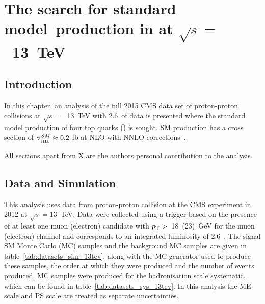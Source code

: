 \chapter{The search for standard model~\tttt production in \runtwo at $\sqrt{s} =$~13~TeV \label{c:Run2}}


\section{Introduction}
In this chapter, an analysis of the full 2015 CMS data set of proton-proton collisions at $\sqrt{s} =$~13~TeV with 2.6~\fbinv of data is presented where the standard model production of four top quarks (\tttt) is sought. SM \tttt production has a cross section of $\sigma_{{\mathrm{t}\overline{\mathrm{t}}\mathrm{t}\overline{\mathrm{t}}}}^{SM}  \approx 0.2$ fb at NLO with NNLO corrections~\cite{Barger201070,Bevilacqua2012}. 

All sections apart from X are the authors personal contribution to the analysis.

\section{Data and Simulation}
\label{sec:datasimulation13}
This analysis uses data from proton-proton collision at the CMS experiment in 2012 at $\sqrt{s}=13$~TeV.
Data were collected using a trigger based on the presence of at least one muon (electron) candidate with $p_{\mathrm{T}} > $~18~(23)~GeV for the muon (electron) channel and corresponds to an integrated luminosity of 2.6~\fbinv .
The signal SM \tttt Monte Carlo (MC) samples and the background MC samples are given in table~\ref{tab:datasets_sim_13tev}, along with the MC generator used to produce these samples, the order at which they were produced and the number of events produced. MC samples were produced for the hadronisation scale systematic, which can be found in table~\ref{tab:datasets_sys_13tev}. In this analysis the ME scale and PS scale are treated as separate uncertainties.

